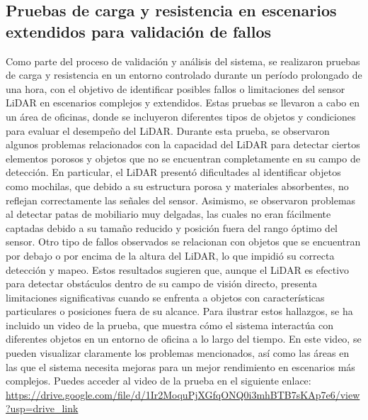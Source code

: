 \subsection{Pruebas de carga y resistencia en escenarios extendidos para validaci\'on de fallos} %
    Como parte del proceso de validaci\'on y an\'alisis del sistema, se realizaron pruebas de carga y resistencia en un 
        entorno controlado durante un per\'iodo prolongado de una hora, con el objetivo de identificar posibles 
        fallos o limitaciones del sensor LiDAR en escenarios complejos y extendidos. Estas pruebas se llevaron 
        a cabo en un \'area de oficinas, donde se incluyeron diferentes tipos de objetos y condiciones para evaluar 
        el desempe\~no del LiDAR.
    \vskip 0.5cm
    Durante esta prueba, se observaron algunos problemas relacionados con la capacidad del LiDAR para detectar ciertos 
        elementos porosos y objetos que no se encuentran completamente en su campo de detecci\'on. En particular, el 
        LiDAR present\'o dificultades al identificar objetos como mochilas, que debido a su estructura porosa y 
        materiales absorbentes, no reflejan correctamente las se\~nales del sensor. Asimismo, se observaron 
        problemas al detectar patas de mobiliario muy delgadas, las cuales no eran f\'acilmente captadas 
        debido a su tama\~no reducido y posici\'on fuera del rango \'optimo del sensor.
    \vskip 0.5cm
    Otro tipo de fallos observados se relacionan con objetos que se encuentran por debajo o por encima de 
        la altura del LiDAR, lo que impidi\'o su correcta detecci\'on y mapeo. Estos resultados sugieren que, 
        aunque el LiDAR es efectivo para detectar obst\'aculos dentro de su campo de visi\'on directo, presenta 
        limitaciones significativas cuando se enfrenta a objetos con caracter\'isticas particulares o posiciones 
        fuera de su alcance.
    \vskip 0.5cm
    Para ilustrar estos hallazgos, se ha incluido un video de la prueba, que muestra c\'omo el sistema interact\'ua 
        con diferentes objetos en un entorno de oficina a lo largo del tiempo. En este video, se pueden visualizar 
        claramente los problemas mencionados, as\'i como las \'areas en las que el sistema necesita mejoras para un mejor 
        rendimiento en escenarios m\'as complejos.
    \vskip 0.5cm
    Puedes acceder al video de la prueba en el siguiente enlace: \url{https://drive.google.com/file/d/1Ir2MoquPjXGfqONQ0i3mhBTB7sKAp7e6/view?usp=drive_link}